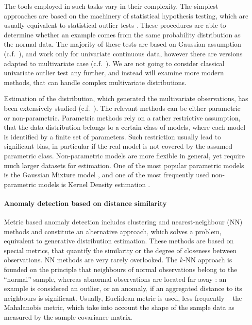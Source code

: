 \documentclass[a4paper,14pt]{extarticle}
\begin{document}
The tools employed in such tasks vary in their complexity. The simplest approaches
are based on the machinery of statistical hypothesis testing, which are usually equivalent
to statistical outlier tests \cite{vic1994}. These procedures are able to determine
whether an example comes from the same probability distribution as the normal data.
The majority of these tests are based on Gaussian assumption (c.f.~\cite{grubbs1969}),
and work only for univariate continuous data, however there are versions adapted
to multivariate case (c.f.~\cite{aggarwal2008,vic1994}). We are not going to consider
classical univariate outlier test any further, and instead will examine more modern
methods, that can handle complex multivariate distributions.

Estimation of the distribution, which generated the multivariate observations, has
been extensively studied (c.f.~\cite{chow1970,scott2008}). The relevant methods can
be either parametric or non-parametric. Parametric methods rely on a rather restrictive
assumption, that the data distribution belongs to a certain class of models, where
each model is identified by a finite set of parameters. Such restriction usually
lead to significant bias, in particular if the real model is not covered by the assumed
parametric class. Non-parametric models are more flexible in general, yet require
much larger datasets for estimation. One of the most popular parametric models is
the Gaussian Mixture model \cite{markou2003,chandola2009,miljkovic2010}, and one
of the most frequently used non-parametric models is Kernel Density estimation
\cite{duda2012,markou2003,chandola2009}.


\paragraph{Anomaly detection based on distance similarity} %
\label{par:anomaly_detection_based_on_distance_similarity}

Metric based anomaly detection includes clustering and nearest-neighbour (NN) methods
and constitute an alternative approach, which solves a problem, equivalent to generative
distribution estimation. These methods are based on special metrics, that quantify
the similarity or the degree of closeness between observations. NN methods are very
rarely overlooked. The $k$-NN approach is founded on the principle that neighbours
of normal observations belong to the ``normal'' sample, whereas abnormal observations
are located far away \cite{hautamaki2004}: an example is considered an outlier, or
an anomaly, if an aggregated distance to its neighbours is significant. Usually,
Euclidean metric is used, less frequently -- the Mahalanobis metric, which take
into account the shape of the sample data as measured by the sample covariance matrix.
\end{document}
